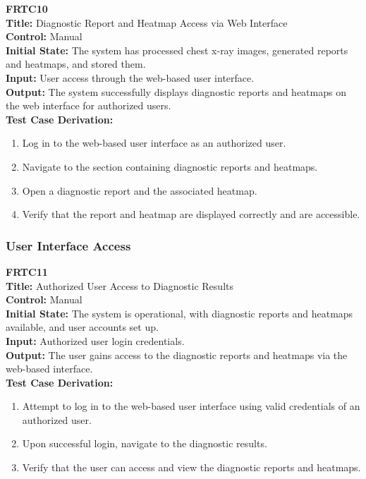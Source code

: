 \documentclass[12pt, titlepage]{article}
\begin{document}
\textbf{FRTC10}\\
\textbf{Title:} Diagnostic Report and Heatmap Access via Web Interface\\
\textbf{Control:} Manual\\
\textbf{Initial State:} The system has processed chest x-ray images, generated reports and heatmaps, and stored them.\\
\textbf{Input:} User access through the web-based user interface.\\
\textbf{Output:} The system successfully displays diagnostic reports and heatmaps on the web interface for authorized users.\\
\textbf{Test Case Derivation:}
\begin{enumerate}
  \item Log in to the web-based user interface as an authorized user.
  \item Navigate to the section containing diagnostic reports and heatmaps.
  \item Open a diagnostic report and the associated heatmap.
  \item Verify that the report and heatmap are displayed correctly and are accessible.
\end{enumerate}
\vspace{1em}

\subsubsection{User Interface Access}
\textbf{FRTC11}\\
\textbf{Title:} Authorized User Access to Diagnostic Results\\
\textbf{Control:} Manual\\
\textbf{Initial State:} The system is operational, with diagnostic reports and heatmaps available, and user accounts set up.\\
\textbf{Input:} Authorized user login credentials.\\
\textbf{Output:} The user gains access to the diagnostic reports and heatmaps via the web-based interface.\\
\textbf{Test Case Derivation:}
\begin{enumerate}
  \item Attempt to log in to the web-based user interface using valid credentials of an authorized user.
  \item Upon successful login, navigate to the diagnostic results.
  \item Verify that the user can access and view the diagnostic reports and heatmaps.
\end{enumerate}
\vspace{1em}
\end{document}
